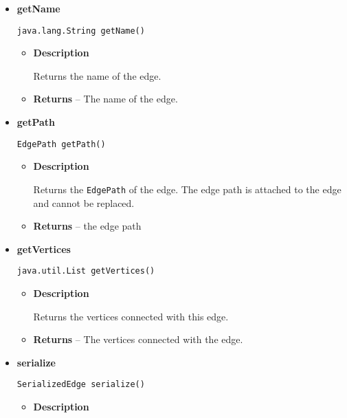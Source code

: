 {{{{{{\begin{itemize}
{\begin{itemize}
{Returns the label of the edge.
}
\item{{\bf  Returns} -- 
The label of the edge. 
}%
\end{itemize}
}%
\item{ 
{\bf  getName}\\
\begin{lstlisting}[frame=none]
java.lang.String getName()\end{lstlisting} %
\begin{itemize}
\item{
{\bf  Description}

Returns the name of the edge.
}
\item{{\bf  Returns} -- 
The name of the edge. 
}%
\end{itemize}
}%
\item{ 
{\bf  getPath}\\
\begin{lstlisting}[frame=none]
EdgePath getPath()\end{lstlisting} %
\begin{itemize}
\item{
{\bf  Description}

Returns the \texttt{\small EdgePath}{\small 
{}} of the edge. The edge path is attached to the edge and cannot be replaced.
}
\item{{\bf  Returns} -- 
the edge path 
}%
\end{itemize}
}%
\item{ 
{\bf  getVertices}\\
\begin{lstlisting}[frame=none]
java.util.List getVertices()\end{lstlisting} %
\begin{itemize}
\item{
{\bf  Description}

Returns the vertices connected with this edge.
}
\item{{\bf  Returns} -- 
The vertices connected with the edge. 
}%
\end{itemize}
}%
\item{ 
{\bf  serialize}\\
\begin{lstlisting}[frame=none]
SerializedEdge serialize()\end{lstlisting} %
\begin{itemize}
\item{
{\bf  Description}

}
\end{itemize}}
\end{itemize}}}}}}}
